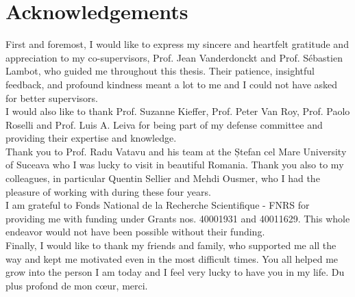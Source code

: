 \chapter*{Acknowledgements}

First and foremost, I would like to express my sincere and heartfelt gratitude and appreciation to my co-supervisors, Prof. Jean Vanderdonckt and Prof. Sébastien Lambot, who guided me throughout this thesis. Their patience, insightful feedback, and profound kindness meant a lot to me and I could not have asked for better supervisors.
\\

I would also like to thank Prof. Suzanne Kieffer, Prof. Peter Van Roy, Prof. Paolo Roselli and Prof. Luis A. Leiva for being part of my defense committee and providing their expertise and knowledge.
\\

Thank you to Prof. Radu Vatavu and his team at the Ștefan cel Mare University of Suceava who I was lucky to visit in beautiful Romania.
Thank you also to my colleagues, in particular Quentin Sellier and Mehdi Ousmer, who I had the pleasure of working with during these four years.
\\

I am grateful to Fonds National de la Recherche Scientifique - FNRS for providing me with funding under Grants nos. 40001931 and 40011629. This whole endeavor would not have been possible without their funding.
\\

Finally, I would like to thank my friends and family, who supported me all the way and kept me motivated even in the most difficult times. You all helped me grow into the person I am today and I feel very lucky to have you in my life. Du plus profond de mon c\oe{}ur, merci.